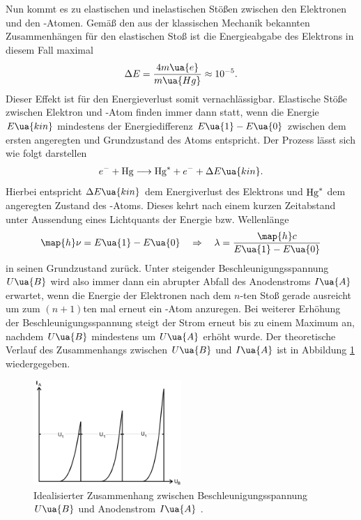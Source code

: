 Nun kommt es zu elastischen und inelastischen Stößen zwischen den Elektronen und den -Atomen. Gemäß
den aus der klassischen Mechanik bekannten Zusammenhängen für den elastischen Stoß ist die Energieabgabe
des Elektrons in diesem Fall maximal
\begin{equation}
  \Delta E = \frac{4 m\ua{e}}{m\ua{Hg}} \approx \num{e-5}.
\end{equation}
Dieser Effekt ist für den Energieverlust somit vernachlässigbar. Elastische Stöße zwischen Elektron und
-Atom finden immer dann statt, wenn die Energie $E\ua{kin}$ mindestens der Energiedifferenz $E\ua{1} - E\ua{0}$
zwischen dem ersten angeregten und Grundzustand des  Atoms entspricht. Der Prozess lässt sich wie folgt darstellen
\begin{equation}
  e^{-} + \ce{Hg} \longrightarrow \ce{Hg}^{*} + e^{-} + \Delta E\ua{kin}.
\end{equation}
Hierbei entspricht $\Delta E\ua{kin}$ dem Energiverlust des Elektrons und $\ce{Hg}^*$ dem angeregten Zustand des
-Atoms. Dieses kehrt nach einem kurzen Zeitabstand unter Aussendung eines Lichtquants der Energie bzw. Wellenlänge
\begin{equation}
  \map{h}\nu = E\ua{1} - E\ua{0} \quad \Rightarrow \quad \lambda = \frac{\map{h} c}{E\ua{1} - E\ua{0}}
  \label{eq: wellenlänge}
\end{equation}
in seinen Grundzustand zurück. Unter steigender Beschleunigungsspannung $U\ua{B}$ wird also immer dann ein
abrupter Abfall des Anodenstroms $I\ua{A}$ erwartet, wenn die Energie der Elektronen nach dem $n$-ten Stoß gerade
ausreicht um zum $(n+1)$ten mal erneut ein -Atom anzuregen. Bei weiterer Erhöhung der Beschleunigungsspannung
steigt der Strom erneut bis zu einem Maximum an, nachdem $U\ua{B}$ mindestens um $U\ua{A}$ erhöht wurde.
Der theoretische Verlauf des Zusammenhangs zwischen
$U\ua{B}$ und $I\ua{A}$ ist in Abbildung \ref{fig: theo_verlauf} wiedergegeben.
\begin{figure}
  \centering
  \includegraphics[width = 0.5\textwidth]{pics/theo_verlauf.png}
  \caption{Idealisierter Zusammenhang zwischen Beschleunigungsspannung $U\ua{B}$ und Anodenstrom $I\ua{A}$ \cite{anleitung601}.}
  \label{fig: theo_verlauf}
\end{figure}
